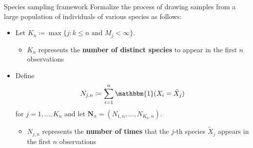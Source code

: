 \documentclass[11pt, handout]{beamer}
\begin{document}
\begin{frame}[t]{Species sampling framework}
    Formalize the process of drawing samples from a large population of individuals of various species as follows:
    \begin{itemize}
        \item<1-> Let \(K_n \coloneqq \max\{j \colon k \leq n \text{ and } M_j < \infty\}\).
        \begin{itemize}
            \item \(K_n\) represents the \textbf{number of distinct species} to appear in the first \(n\) observations
        \end{itemize}
        \item<2-> Define
        \begin{equation*}
            N_{j,n} \coloneqq \sum_{i=1}^n \mathbbm{1}(X_i = \tilde{X}_j)
        \end{equation*}
        for \(j = 1,...,K_n\) and let \(\mathbf{N}_{n} = (N_{1,n},...,N_{K_n,n})\).
        \begin{itemize}
            \item \(N_{j,n}\) represents the \textbf{number of times} that the \(j\)-th species \(\tilde{X}_j\) appears in the first \(n\) observations
        \end{itemize}
    \end{itemize}
\end{frame}
\end{document}
